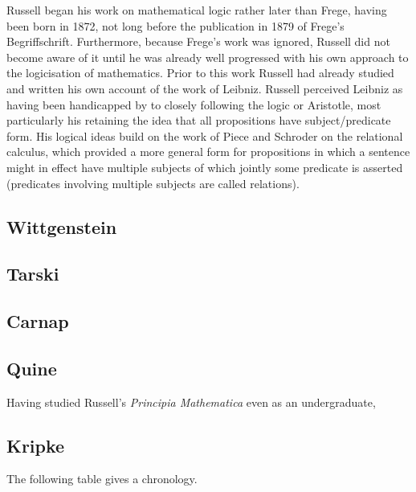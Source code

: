 Russell began his work on mathematical logic rather later than Frege, having been born in 1872, not long before the publication in 1879 of Frege's Begriffschrift.
Furthermore, because Frege's work was ignored, Russell did not become aware of it until he was already well progressed with his own approach to the logicisation of mathematics.
Prior to this work Russell had already studied and written his own account of the work of Leibniz.
Russell perceived Leibniz as having been handicapped by to closely following the logic or Aristotle, most particularly his retaining the idea that all propositions have subject/predicate form.
His logical ideas build on the work of Piece and Schroder on the relational calculus, which provided a more general form for propositions in which a sentence might in effect have multiple subjects of which jointly some predicate is asserted (predicates involving multiple subjects are called relations).

\subsection{Wittgenstein}

\subsection{Tarski}

\subsection{Carnap}

\subsection{Quine}

Having studied Russell's \emph{Principia Mathematica} even as an undergraduate, 

\subsection{Kripke}
The following table gives a chronology.

